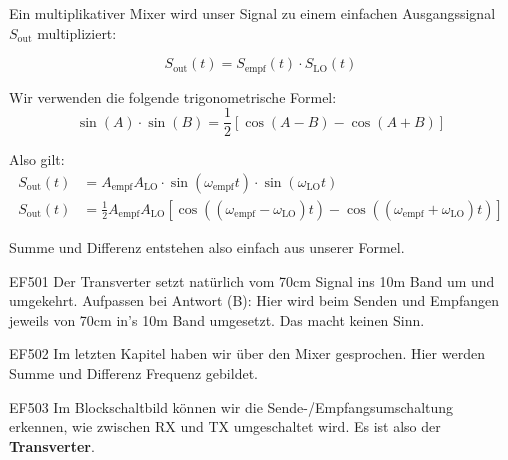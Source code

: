 \begin{ohmchapter}
Ein multiplikativer Mixer wird unser Signal zu einem einfachen Ausgangssignal $S_{\text{out}}$ multipliziert:

\begin{equation*}
    S_{\text{out}}(t) = S_{\text{empf}}(t) \cdot S_{\text{LO}}(t)
\end{equation*}

Wir verwenden die folgende trigonometrische Formel:
\begin{equation*}
    \label{eq:sin_prod}
    \sin(A) \cdot \sin(B) = \frac{1}{2} \left[ \cos(A-B) - \cos(A+B) \right]
\end{equation*}


Also gilt:
\begin{align*}
    S_{\text{out}}(t) &= A_{\text{empf}} A_{\text{LO}} \cdot \sin(\omega_{\text{empf}} t) \cdot \sin(\omega_{\text{LO}} t) \\
    S_{\text{out}}(t) &= \frac{1}{2} A_{\text{empf}} A_{\text{LO}} \left[ \cos((\omega_{\text{empf}} - \omega_{\text{LO}}) t) - \cos((\omega_{\text{empf}} + \omega_{\text{LO}}) t) \right]
\end{align*}

Summe und Differenz entstehen also einfach aus unserer Formel.



\end{ohmchapter}

\begin{sol}{EF501}
    Der Transverter setzt natürlich vom 70cm Signal ins 10m Band um und umgekehrt.
    Aufpassen bei Antwort (B): Hier wird beim Senden und Empfangen jeweils von 70cm in's 10m Band umgesetzt. Das macht keinen Sinn. 

\end{sol}
\begin{sol}{EF502}
    Im letzten Kapitel haben wir über den Mixer gesprochen. Hier werden Summe und Differenz Frequenz gebildet.
\end{sol}
\begin{sol}{EF503}
    Im Blockschaltbild können wir die Sende-/Empfangsumschaltung erkennen, wie zwischen RX und TX umgeschaltet wird. Es ist also der \textbf{Transverter}.
\end{sol}

